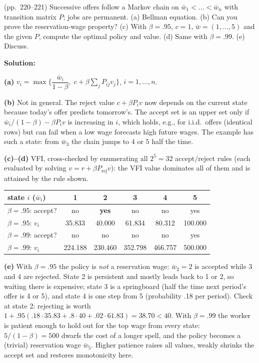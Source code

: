 \documentclass[12pt, letterpaper]{article}
\begin{document}
\begin{tcolorbox}[oddbox,title={Exercise 6.25 \quad Markov Wages}]
\begin{tcolorbox}[questionbox]
(pp.~220--221) Successive offers follow a Markov chain on $\bar w_1<\dots<\bar w_n$ with transition matrix $P$; jobs are
permanent. (a) Bellman equation. (b) Can you prove the reservation-wage property? (c) With $\beta=.95$,
$c=1$, $\bar w=(1,\dots,5)$ and the given $P$, compute the optimal policy and value. (d) Same with $\beta=.99$.
(e) Discuss.
\end{tcolorbox}

\textbf{Solution:}

\textbf{(a)} $\boxed{v_i=\max\Big\{\dfrac{\bar w_i}{1-\beta},\;c+\beta\sum_jP_{ij}v_j\Big\}}$, $i=1,\dots,n$.

\textbf{(b)} Not in general. The reject value $c+\beta P_iv$ now depends on the current state because today's
offer predicts tomorrow's. The accept set is an upper set only if $\bar w_i/(1-\beta)-\beta P_iv$ is increasing in
$i$, which holds, e.g., for i.i.d.\ offers (identical rows) but can fail when a low wage forecasts high
future wages. The example has such a state: from $\bar w_3$ the chain jumps to $4$ or $5$ half the time.

\textbf{(c)--(d)} VFI, cross-checked by enumerating all $2^5=32$ accept/reject rules (each evaluated by solving
$v=r+\beta P_{\text{rej}}v$): the VFI value dominates all of them and is attained by the rule shown.
\begin{center}\small
\begin{tabular}{@{}lccccc@{}}
\toprule
state $i$ ($\bar w_i$) & 1 & 2 & 3 & 4 & 5\\
\midrule
$\beta=.95$: accept? & no & \textbf{yes} & no & no & yes\\
$\beta=.95$: $v_i$ & 35.833 & 40.000 & 61.834 & 80.312 & 100.000\\
$\beta=.99$: accept? & no & no & no & no & yes\\
$\beta=.99$: $v_i$ & 224.188 & 230.460 & 352.798 & 466.757 & 500.000\\
\bottomrule
\end{tabular}
\end{center}
\textbf{(e)} With $\beta=.95$ the policy is \emph{not} a reservation wage: $\bar w_2=2$ is accepted while $3$ and $4$ are
rejected. State 2 is persistent and mostly leads back to 1 or 2, so waiting there is expensive; state 3 is a
springboard (half the time next period's offer is 4 or 5), and state 4 is one step from 5 (probability
.18 per period). Check at state 2: rejecting is worth $1+.95(.18\cdot35.83+.8\cdot40+.02\cdot61.83)=38.70<40$. With
$\beta=.99$ the worker is patient enough to hold out for the top wage from every state: $5/(1-\beta)=500$
dwarfs the cost of a longer spell, and the policy becomes a (trivial) reservation wage $\bar w_5$. Higher patience
raises all values, weakly shrinks the accept set and restores monotonicity here.
\end{tcolorbox}
\end{document}
